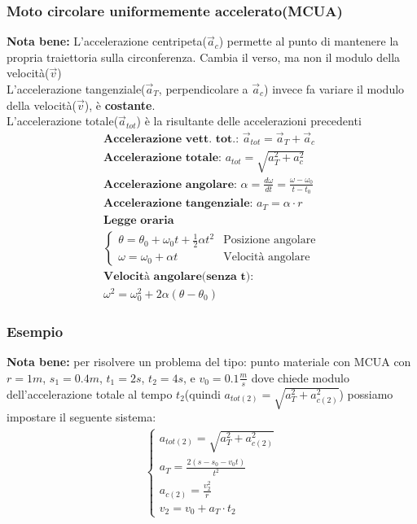 \subsubsection{Moto circolare uniformemente accelerato(MCUA)}
\textbf{Nota bene: } L'accelerazione centripeta($\vec{a}_c$) permette al punto di mantenere la propria traiettoria sulla circonferenza. Cambia il verso, ma non il modulo della velocità($\vec{v}$) \\
L'accelerazione tangenziale($\vec{a}_T$, perpendicolare a $\vec{a}_c$) invece fa variare il modulo della velocità($\vec{v}$), è \textbf{costante}. \\
L'accelerazione totale($\vec{a}_{tot}$) è la risultante delle accelerazioni precedenti \\
\begin{gather*}
    \textbf{Accelerazione vett. tot.: } \vec{a}_{tot} = \vec{a}_T + \vec{a}_c \\
    \textbf{Accelerazione totale: } a_{tot} = \sqrt{a_T^2 + a_c^2} \\
    \textbf{Accelerazione angolare: } \alpha = \frac{d \omega}{d t} = \frac{\omega - \omega_0}{t - t_0} \\
    \textbf{Accelerazione tangenziale: } a_T = \alpha \cdot r \\
    \textbf{Legge oraria} \\
    \begin{cases}
        \theta = \theta_0 + \omega_0 t + \frac{1}{2} \alpha t^2 & \text{Posizione angolare} \\
        \omega = \omega_0 + \alpha t                            & \text{Velocità angolare}
    \end{cases} \\
    \textbf{Velocità angolare(senza t): } \\ \omega^2 = \omega_0^2 + 2 \alpha(\theta - \theta_0)
\end{gather*}
\subsubsection{Esempio}
\textbf{Nota bene: } per risolvere un problema del tipo: punto materiale con MCUA con $r = 1m$, $s_1 = 0.4m$, $t_1 = 2s$, $t_2 = 4s$, e $v_0 = 0.1 \frac{m}{s}$ dove chiede modulo dell'accelerazione totale al tempo $t_2$(quindi $a_{tot(2)} = \sqrt{a_T^2 + a_{c(2)}^2}$) possiamo impostare il seguente sistema:
\begin{gather*}
    \begin{cases}
        a_{tot(2)} = \sqrt{a_T^2 + a_{c(2)}^2} \\
        a_T = \frac{2(s - s_0 - v_0 t)}{t^2}   \\
        a_{c(2)} = \frac{v_2^2}{r}             \\
        v_{2} = v_0 + a_T \cdot t_2
    \end{cases}
\end{gather*}
